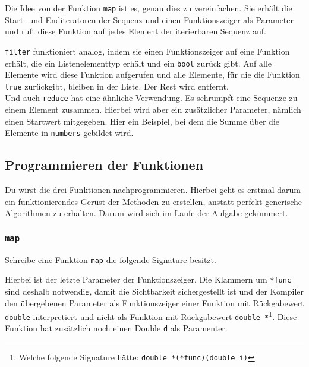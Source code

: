 Die Idee von der Funktion \lstinline{map} ist es, genau dies zu vereinfachen.
Sie erhält die Start- und Enditeratoren der Sequenz und einen Funktionszeiger als Parameter und ruft diese Funktion auf jedes Element der iterierbaren Sequenz auf.



\lstinline{filter} funktioniert analog, indem sie einen Funktionszeiger auf eine Funktion erhält, die ein Listenelementtyp erhält und ein \lstinline{bool} zurück gibt.
Auf alle Elemente wird diese Funktion aufgerufen und alle Elemente, für die die Funktion \lstinline{true} zurückgibt, bleiben in der Liste. Der Rest wird entfernt. \\



Und auch \lstinline{reduce} hat eine ähnliche Verwendung.
Es schrumpft eine Sequenze zu einem Element zusammen.
Hierbei wird aber ein zusätzlicher Parameter, nämlich einen Startwert mitgegeben.
Hier ein Beispiel, bei dem die Summe über die Elemente in \lstinline{numbers} gebildet wird.



\subsection{Programmieren der Funktionen}
\label{sec:map-filter-reduce-basic-impl}

Du wirst die drei Funktionen nachprogrammieren.
Hierbei geht es erstmal darum ein funktionierendes Gerüst der Methoden zu erstellen, anstatt perfekt generische Algorithmen zu erhalten.
Darum wird sich im Laufe der Aufgabe gekümmert.

\subsubsection{\lstinline{map}}

Schreibe eine Funktion \lstinline{map} die folgende Signature besitzt.



Hierbei ist der letzte Parameter der Funktionszeiger.
Die Klammern um \lstinline{*func} sind deshalb notwendig, damit die Sichtbarkeit sichergestellt ist und der Kompiler den übergebenen Parameter als Funktionszeiger einer Funktion mit Rückgabewert \lstinline{double} interpretiert und nicht als Funktion mit Rückgabewert \lstinline{double *}\footnote{Welche folgende Signature hätte: \lstinline{double *(*func)(double i)}}.
Diese Funktion hat zusätzlich noch einen Double \lstinline{d} als Paramenter.

